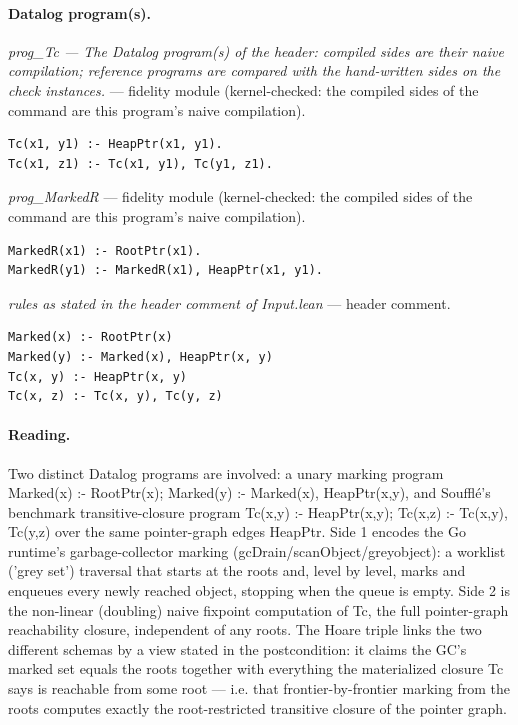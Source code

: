 \documentclass[10pt]{article}
\begin{document}
\paragraph{Datalog program(s).}

{\raggedright\textit{prog\_Tc --- The Datalog program(s) of the header: compiled sides are their naive compilation; reference programs are compared with the hand-written sides on the check instances.} --- fidelity module (kernel-checked: the compiled sides of the command are this program's naive compilation).\par}

\begin{Verbatim}[fontsize=\scriptsize,breaklines=true,breakanywhere=true,frame=single,framesep=1.5mm]
Tc(x1, y1) :- HeapPtr(x1, y1).
Tc(x1, z1) :- Tc(x1, y1), Tc(y1, z1).
\end{Verbatim}

{\raggedright\textit{prog\_MarkedR} --- fidelity module (kernel-checked: the compiled sides of the command are this program's naive compilation).\par}

\begin{Verbatim}[fontsize=\scriptsize,breaklines=true,breakanywhere=true,frame=single,framesep=1.5mm]
MarkedR(x1) :- RootPtr(x1).
MarkedR(y1) :- MarkedR(x1), HeapPtr(x1, y1).
\end{Verbatim}

{\raggedright\textit{rules as stated in the header comment of Input.lean} --- header comment.\par}

\begin{Verbatim}[fontsize=\scriptsize,breaklines=true,breakanywhere=true,frame=single,framesep=1.5mm]
Marked(x) :- RootPtr(x)
Marked(y) :- Marked(x), HeapPtr(x, y)
Tc(x, y) :- HeapPtr(x, y)
Tc(x, z) :- Tc(x, y), Tc(y, z)
\end{Verbatim}

\paragraph{Reading.} Two distinct Datalog programs are involved: a unary marking program Marked(x) :- RootPtr(x); Marked(y) :- Marked(x), HeapPtr(x,y), and Soufflé's benchmark transitive-closure program Tc(x,y) :- HeapPtr(x,y); Tc(x,z) :- Tc(x,y), Tc(y,z) over the same pointer-graph edges HeapPtr. Side 1 encodes the Go runtime's garbage-collector marking (gcDrain/scanObject/greyobject): a worklist ('grey set') traversal that starts at the roots and, level by level, marks and enqueues every newly reached object, stopping when the queue is empty. Side 2 is the non-linear (doubling) naive fixpoint computation of Tc, the full pointer-graph reachability closure, independent of any roots. The Hoare triple links the two different schemas by a view stated in the postcondition: it claims the GC's marked set equals the roots together with everything the materialized closure Tc says is reachable from some root --- i.e. that frontier-by-frontier marking from the roots computes exactly the root-restricted transitive closure of the pointer graph.
\end{document}
